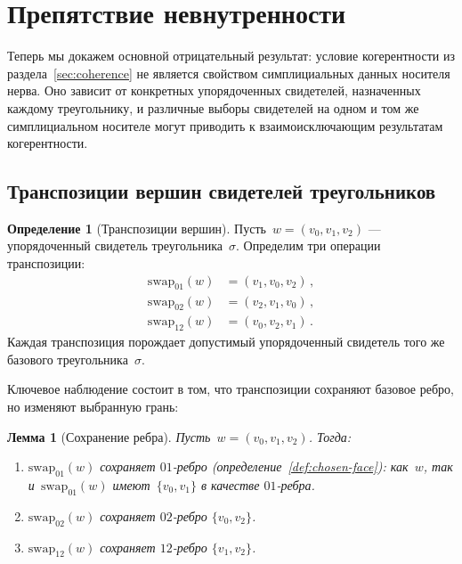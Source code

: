 \documentclass[11pt,a4paper]{article}
\theoremstyle{plain}
\newtheorem{lemma}[theorem]{Лемма}
\theoremstyle{definition}
\newtheorem{definition}[theorem]{Определение}
\theoremstyle{remark}
\newcommand{\swapAB}{\mathrm{swap}_{01}}
\newcommand{\swapAC}{\mathrm{swap}_{02}}
\newcommand{\swapBC}{\mathrm{swap}_{12}}
\begin{document}
\section{Препятствие невнутренности}
\label{sec:obstruction}

Теперь мы докажем основной отрицательный результат: условие когерентности
из раздела~\ref{sec:coherence} не является свойством симплициальных данных
носителя нерва. Оно зависит от конкретных упорядоченных свидетелей,
назначенных каждому треугольнику, и различные выборы свидетелей на одном
и том же симплициальном носителе могут приводить к взаимоисключающим
результатам когерентности.

\subsection{Транспозиции вершин свидетелей треугольников}
\label{sec:swaps}

\begin{definition}[Транспозиции вершин]
\label{def:swaps}
Пусть~$w = (v_0, v_1, v_2)$ --- упорядоченный свидетель
треугольника~$\sigma$. Определим три операции транспозиции:
\begin{align}
  \swapAB(w) &= (v_1, v_0, v_2)\,, \label{eq:swapAB} \\
  \swapAC(w) &= (v_2, v_1, v_0)\,, \label{eq:swapAC} \\
  \swapBC(w) &= (v_0, v_2, v_1)\,. \label{eq:swapBC}
\end{align}
Каждая транспозиция порождает допустимый упорядоченный свидетель того же
базового треугольника~$\sigma$.
\end{definition}

Ключевое наблюдение состоит в том, что транспозиции сохраняют базовое
ребро, но изменяют выбранную грань:

\begin{lemma}[Сохранение ребра]
\label{lem:edge-preservation}
Пусть~$w = (v_0, v_1, v_2)$. Тогда:
\begin{enumerate}[label=\textup{(\alph*)},nosep]
  \item $\swapAB(w)$ сохраняет $01$-ребро
        (определение~\ref{def:chosen-face}): как~$w$, так и~$\swapAB(w)$
        имеют~$\{v_0, v_1\}$ в качестве $01$-ребра.
  \item $\swapAC(w)$ сохраняет $02$-ребро $\{v_0, v_2\}$.
  \item $\swapBC(w)$ сохраняет $12$-ребро $\{v_1, v_2\}$.
\end{enumerate}
\end{lemma}
\end{document}

